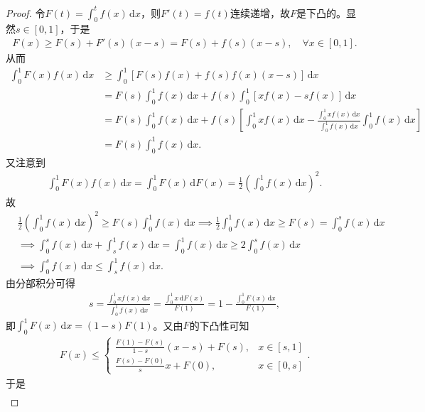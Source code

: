 \documentclass[../../main.tex]{subfiles}
\begin{document}
\begin{proof}
令$F(t) = \int_0^t f(x) \, \mathrm{d}x$，则$F'(t) = f(t)$连续递增，故$F$是下凸的。显然$s \in [0,1]$，于是
\begin{align*}
F(x) \geq F(s) + F'(s)(x - s) = F(s) + f(s)(x - s), \quad \forall x \in [0,1].
\end{align*}
从而
\begin{align*}
\int_0^1 F(x) f(x) \, \mathrm{d}x &\geq \int_0^1 \left[ F(s) f(x) + f(s) f(x)(x - s) \right] \, \mathrm{d}x \\
&= F(s) \int_0^1 f(x) \, \mathrm{d}x + f(s) \int_0^1 \left[ x f(x) - s f(x) \right] \, \mathrm{d}x \\
&= F(s) \int_0^1 f(x) \, \mathrm{d}x + f(s) \left[ \int_0^1 x f(x) \, \mathrm{d}x - \frac{\int_0^1 x f(x) \, \mathrm{d}x}{\int_0^1 f(x) \, \mathrm{d}x} \int_0^1 f(x) \, \mathrm{d}x \right] \\
&= F(s) \int_0^1 f(x) \, \mathrm{d}x.
\end{align*}
又注意到
\begin{align*}
\int_0^1 F(x) f(x) \, \mathrm{d}x = \int_0^1 F(x) \, \mathrm{d}F(x) = \frac{1}{2} \left( \int_0^1 f(x) \, \mathrm{d}x \right)^2.
\end{align*}
故
\begin{align*}
&\frac{1}{2} \left( \int_0^1 f(x) \, \mathrm{d}x \right)^2 \geq F(s) \int_0^1 f(x) \, \mathrm{d}x \implies \frac{1}{2} \int_0^1 f(x) \, \mathrm{d}x \geq F(s) = \int_0^s f(x) \, \mathrm{d}x \\
&\implies \int_0^s f(x) \, \mathrm{d}x + \int_s^1 f(x) \, \mathrm{d}x = \int_0^1 f(x) \, \mathrm{d}x \geq 2 \int_0^s f(x) \, \mathrm{d}x \\
&\implies \int_0^s f(x) \, \mathrm{d}x \leq \int_s^1 f(x) \, \mathrm{d}x.
\end{align*}
由分部积分可得
\begin{align*}
s = \frac{\int_0^1 x f(x) \, \mathrm{d}x}{\int_0^1 f(x) \, \mathrm{d}x} = \frac{\int_0^1 x \, \mathrm{d}F(x)}{F(1)} = 1 - \frac{\int_0^1 F(x) \, \mathrm{d}x}{F(1)},
\end{align*}
即$\int_0^1 F(x) \, \mathrm{d}x = (1 - s) F(1)$。又由$F$的下凸性可知
\begin{align*}
F(x) \leq 
\begin{cases}
\frac{F(1) - F(s)}{1 - s}(x - s) + F(s), & x \in [s,1] \\
\frac{F(s) - F(0)}{s}x + F(0), & x \in [0,s]
\end{cases}.
\end{align*}
于是
\begin{align*}

\end{align*}
\end{proof}
\end{document}

